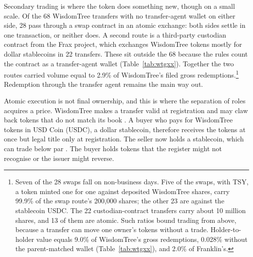 \documentclass[12pt,a4paper]{article}
\begin{document}
Secondary trading is where the token does something new, though on a small scale. Of the 68 WisdomTree transfers with no transfer-agent wallet on either side, 28 pass through a swap contract in an atomic exchange: both sides settle in one transaction, or neither does. A second route is a third-party custodian contract from the Frax project, which exchanges WisdomTree tokens mostly for dollar stablecoins in 22 transfers. These sit outside the 68 because the rules count the contract as a transfer-agent wallet (Table~\ref{tab:wtgxx}). Together the two routes carried volume equal to 2.9\% of WisdomTree's filed gross redemptions.\footnote{Seven of the 28 swaps fall on non-business days. Five of the swaps, with TSY, a token minted one for one against deposited WisdomTree shares, carry 99.9\% of the swap route's 200,000 shares; the other 23 are against the stablecoin USDC. The 22 custodian-contract transfers carry about 10 million shares, and 13 of them are atomic. Such ratios bound trading from above, because a transfer can move one owner's tokens without a trade. Holder-to-holder value equals 9.0\% of WisdomTree's gross redemptions, 0.028\% without the parent-matched wallet (Table~\ref{tab:wtgxx}), and 2.0\% of Franklin's.} Redemption through the transfer agent remains the main way out.

Atomic execution is not final ownership, and this is where the separation of roles acquires a price. WisdomTree makes a transfer valid at registration and may claw back tokens that do not match its book \citep[pp.~109, 143]{WisdomTreeTMMDF2025}. A buyer who pays for WisdomTree tokens in USD Coin (USDC), a dollar stablecoin, therefore receives the tokens at once but legal title only at registration. The seller now holds a stablecoin, which can trade below par \citep[p.~2]{GarrattShin2023}. The buyer holds tokens that the register might not recognise or the issuer might reverse.
\end{document}
